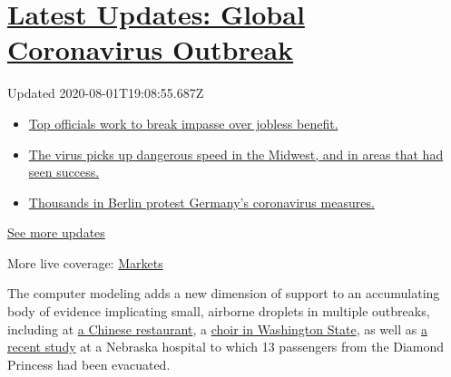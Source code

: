 \hypertarget{latest-updates-global-coronavirus-outbreak}{%
\section{\texorpdfstring{\href{https://www.nytimes3xbfgragh.onion/2020/08/01/world/coronavirus-covid-19.html?action=click\&pgtype=Article\&state=default\&region=MAIN_CONTENT_1\&context=storylines_live_updates}{Latest
Updates: Global Coronavirus
Outbreak}}{Latest Updates: Global Coronavirus Outbreak}}\label{latest-updates-global-coronavirus-outbreak}}

Updated 2020-08-01T19:08:55.687Z

\begin{itemize}
\tightlist
\item
  \href{https://www.nytimes3xbfgragh.onion/2020/08/01/world/coronavirus-covid-19.html?action=click\&pgtype=Article\&state=default\&region=MAIN_CONTENT_1\&context=storylines_live_updates\#link-3ac56579}{Top
  officials work to break impasse over jobless benefit.}
\item
  \href{https://www.nytimes3xbfgragh.onion/2020/08/01/world/coronavirus-covid-19.html?action=click\&pgtype=Article\&state=default\&region=MAIN_CONTENT_1\&context=storylines_live_updates\#link-8796723}{The
  virus picks up dangerous speed in the Midwest, and in areas that had
  seen success.}
\item
  \href{https://www.nytimes3xbfgragh.onion/2020/08/01/world/coronavirus-covid-19.html?action=click\&pgtype=Article\&state=default\&region=MAIN_CONTENT_1\&context=storylines_live_updates\#link-25930521}{Thousands
  in Berlin protest Germany's coronavirus measures.}
\end{itemize}

\href{https://www.nytimes3xbfgragh.onion/2020/08/01/world/coronavirus-covid-19.html?action=click\&pgtype=Article\&state=default\&region=MAIN_CONTENT_1\&context=storylines_live_updates}{See
more updates}

More live coverage:
\href{https://www.nytimes3xbfgragh.onion/live/2020/07/31/business/stock-market-today-coronavirus?action=click\&pgtype=Article\&state=default\&region=MAIN_CONTENT_1\&context=storylines_live_updates}{Markets}

The computer modeling adds a new dimension of support to an accumulating
body of evidence implicating small, airborne droplets in multiple
outbreaks, including at
\href{https://www.nytimes3xbfgragh.onion/2020/04/20/health/airflow-coronavirus-restaurants.html}{a
Chinese restaurant}, a
\href{https://www.medrxiv.org/content/10.1101/2020.06.15.20132027v2}{choir
in Washington State}, as well as
\href{https://www.nature.com/articles/s41598-020-69286-3}{a recent
study} at a Nebraska hospital to which 13 passengers from the Diamond
Princess had been evacuated.

